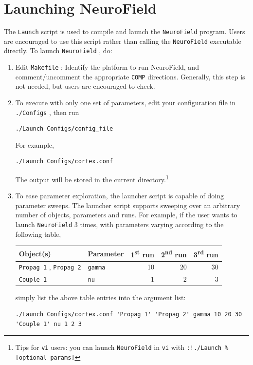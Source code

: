 \documentclass[12pt,a4paper]{article}
\newcommand{\type}[1]{ {\small\small\tt #1} }
\newcommand{\NF}[0]{ \type{NeuroField}}
\begin{document}
\section{Launching NeuroField}
\label{sec:launch}

The \type{Launch} script is used to compile and launch the \NF program. Users are encouraged to use this script rather than calling the \NF executable directly. To launch \NF, do:

\begin{enumerate}

\item Edit \type{Makefile}: Identify the platform to run NeuroField, and comment/uncomment the appropriate \type{COMP} directions. Generally, this step is not needed, but users are encouraged to check.

\item To execute with only one set of parameters, edit your configuration file in \type{./Configs}, then run
\begin{lstlisting}
./Launch Configs/config_file
\end{lstlisting}
For example,
\begin{lstlisting}
./Launch Configs/cortex.conf
\end{lstlisting}
The output will be stored in the current directory.\footnote{Tips for \type{vi} users: you can launch \NF in \type{vi} with \type{:!./Launch \% [optional params]} }

\item To ease parameter exploration, the launcher script is capable of doing parameter sweeps. The launcher script supports sweeping over an arbitrary number of objects, parameters and runs. For example, if the user wants to launch \NF 3 times, with parameters varying according to the following table,

\begin{tabular}{l l r r r}
Object(s)&Parameter&1\textsuperscript{st} run&2\textsuperscript{nd} run&3\textsuperscript{rd} run\\
\hline
\type{Propag 1}, \type{Propag 2}&\type{gamma}&10&20&30\\
\type{Couple 1}&\type{nu}&1&2&3
\end{tabular}

simply list the above table entries into the argument list:
\begin{lstlisting}
./Launch Configs/cortex.conf 'Propag 1' 'Propag 2' gamma 10 20 30 'Couple 1' nu 1 2 3
\end{lstlisting}


\end{enumerate}
\end{document}
